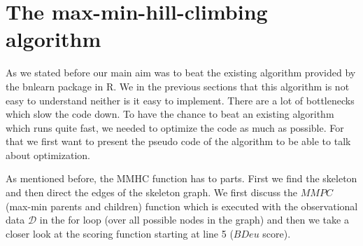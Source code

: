 



\chapter{The max-min-hill-climbing algorithm}

	As we stated before our main aim was to beat the existing algorithm provided by the bnlearn package in R. We in the previous sections that this algorithm is not easy to understand neither is it easy to implement. There are a lot of bottlenecks which slow the code down. To have the chance to beat an existing algorithm which runs quite fast, we needed to optimize the code as much as possible. For that we first want to present the pseudo code of the algorithm to be able to talk about optimization.

	 \label{img.mmhc}

	As mentioned before, the MMHC function has to parts. First we find the skeleton and then direct the edges of the skeleton graph. We first discuss the $MMPC$ (max-min parents and children) function which is executed with the observational data $\mathcal{D}$ in the for loop (over all possible nodes in the graph) and then we take a closer look at the scoring function starting at line 5 ($BDeu$ score).



